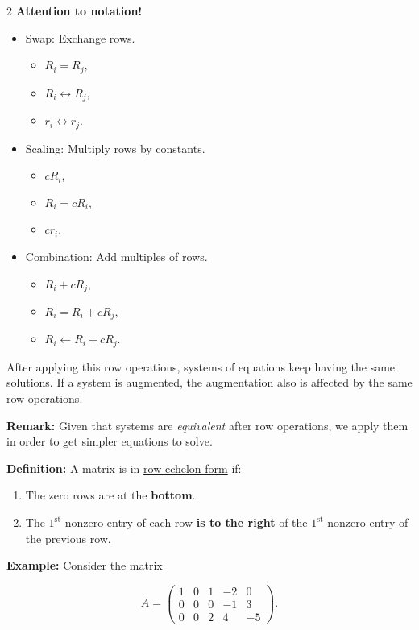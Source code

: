 \documentclass[12pt]{article}
\begin{document}
\begin{multicols}{2}
\textbf{Attention to notation!}
\begin{itemize}
  \item Swap: Exchange rows.
  \begin{itemize}
    \item \(R_i=R_j,\)
    \item \(R_i\leftrightarrow R_j,\) 
    \item \(r_i\leftrightarrow r_j.\)
  \end{itemize}
  \item Scaling: Multiply rows by constants.
  \begin{itemize}
    \item \(cR_i\),
    \item \(R_i=cR_i\), 
    \item \(cr_i\).
  \end{itemize}
  \item Combination: Add multiples of rows.
  \begin{itemize}
    \item \(R_i+cR_j,\)
    \item \(R_i=R_i+cR_j,\)
    \item \(R_i\leftarrow R_i+cR_j.\)
  \end{itemize}
\end{itemize}

After applying this row operations, systems of equations keep having the same solutions. If a system is augmented, the augmentation also is affected by the same row operations.

\textbf{Remark:}
Given that systems are \emph{equivalent} after row operations, we apply them in order to get simpler equations to solve.

\textbf{Definition:}
A matrix is in \underline{row echelon form} if:
\begin{enumerate}
  \item The zero rows are at the \textbf{bottom}.
  \item The \(1^{\text{st}}\) nonzero entry of each row \textbf{is to the right} of the \(1^{\text{st}}\) nonzero entry of the previous row.
\end{enumerate}


\textbf{Example:}
Consider the matrix 

\[A=\begin{pmatrix}
  1&0&1&-2&0\\ 0&0&0&-1&3\\ 0&0&2&4&-5
\end{pmatrix}.\]


\end{multicols}
\end{document}
